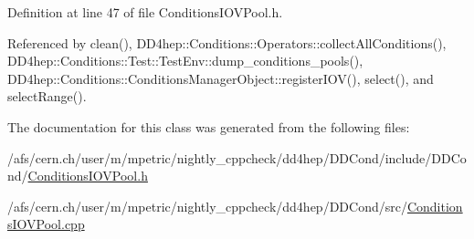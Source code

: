 Definition at line 47 of file ConditionsIOVPool.h.

Referenced by clean(), DD4hep::Conditions::Operators::collectAllConditions(), DD4hep::Conditions::Test::TestEnv::dump\_\-conditions\_\-pools(), DD4hep::Conditions::ConditionsManagerObject::registerIOV(), select(), and selectRange().

The documentation for this class was generated from the following files:\begin{DoxyCompactItemize}
\item 
/afs/cern.ch/user/m/mpetric/nightly\_\-cppcheck/dd4hep/DDCond/include/DDCond/\hyperlink{_conditions_i_o_v_pool_8h}{ConditionsIOVPool.h}\item 
/afs/cern.ch/user/m/mpetric/nightly\_\-cppcheck/dd4hep/DDCond/src/\hyperlink{_conditions_i_o_v_pool_8cpp}{ConditionsIOVPool.cpp}\end{DoxyCompactItemize}
